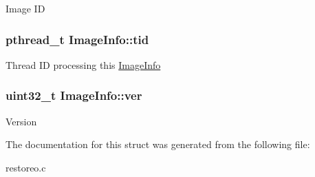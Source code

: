 \-Image \-I\-D \hypertarget{structImageInfo_a58f9ca01e5ad860ad322d567aca091e8}{
\subsubsection[{tid}]{\setlength{\rightskip}{0pt plus 5cm}pthread\-\_\-t {\bf \-Image\-Info\-::tid}}}\label{structImageInfo_a58f9ca01e5ad860ad322d567aca091e8}
\-Thread \-I\-D processing this \hyperlink{structImageInfo}{\-Image\-Info} \hypertarget{structImageInfo_ac34e3b1b959eed46f2c3f882a7864abe}{
\subsubsection[{ver}]{\setlength{\rightskip}{0pt plus 5cm}uint32\-\_\-t {\bf \-Image\-Info\-::ver}}}\label{structImageInfo_ac34e3b1b959eed46f2c3f882a7864abe}
\-Version 

\-The documentation for this struct was generated from the following file\-:\begin{DoxyCompactItemize}
\item 
restoreo.\-c\end{DoxyCompactItemize}
